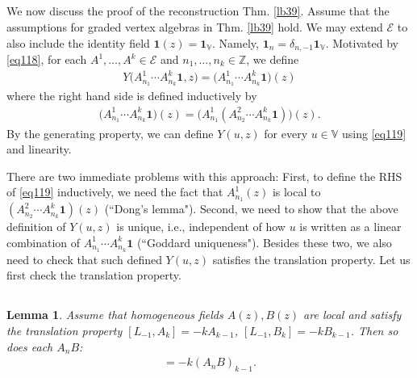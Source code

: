 \documentclass[12pt,a4paper,notitlepage]{article}
\theoremstyle{definition}
\theoremstyle{plain}
\newtheorem{lm}[df]{Lemma}
\newcommand{\mc}{\mathcal}
\newcommand{\id}{\mathbf{1}}
\newcommand{\Vbb}{\mathbb V}
\newcommand{\Zbb}{\mathbb Z}
\numberwithin{equation}{section}
\begin{document}
\subsection{}

We now discuss the proof of the reconstruction Thm. \ref{lb39}. Assume that the assumptions for graded vertex algebras in Thm. \ref{lb39} hold. We may extend $\mc E$ to also include the identity field $\id(z)=\id_\Vbb$. Namely, $\id_n=\delta_{n,-1}\id_\Vbb$. Motivated by \eqref{eq118}, for each $A^1,\dots,A^k\in\mc E$ and $n_1,\dots,n_k\in\Zbb$, we define
\begin{align}
	Y\big(A^1_{n_1}\cdots A^k_{n_k}\id,z\big)=\big(A^1_{n_1}\cdots A^k_{n_k}\id\big)(z)\label{eq119}
\end{align}
where the right hand side is defined inductively by
\begin{align*}
	\big(A^1_{n_1}\cdots A^k_{n_k}\id\big)(z)=\big(A^1_{n_1}(A^2_{n_2}\cdots A^k_{n_k}\id)\big)(z).
\end{align*}
By the generating property, we can define $Y(u,z)$ for every $u\in\Vbb$ using \eqref{eq119} and linearity. 

There are two immediate problems with this approach: First, to define the RHS of \eqref{eq119} inductively, we need the fact that $A^1_{n_1}(z)$ is local to $(A^2_{n_2}\cdots A^k_{n_k}\id)(z)$ (``Dong's lemma"). Second, we need to show that the above definition of $Y(u,z)$ is unique, i.e., independent of how $u$ is written as a linear combination of  $A^1_{n_1}\cdots A^k_{n_k}\id$ (``Goddard uniqueness"). Besides these two, we also need to check that such defined $Y(u,z)$ satisfies the translation property. Let us first check the translation property.



\subsection{}

\begin{lm}\label{lb79}
Assume that homogeneous fields $A(z),B(z)$ are local and satisfy the translation property $[L_{-1},A_k]=-kA_{k-1}$, $[L_{-1},B_k]=-kB_{k-1}$. Then so does each $A_nB$:
\begin{align}
[L_{-1},(A_nB)_k]=-k(A_nB)_{k-1}.\label{eq120}	
\end{align}
\end{lm}
\end{document}
